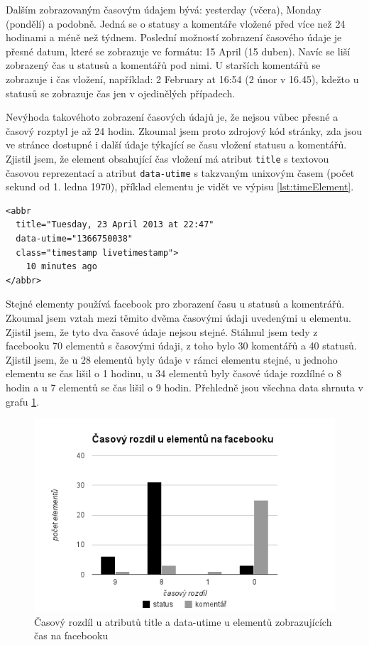 \documentclass[thesis=M,czech]{FITthesis}[2013/05/10]
\begin{document}
Dalším zobrazovaným časovým údajem bývá: yesterday (včera), Monday (pondělí) a podobně. Jedná se o statusy a komentáře vložené před více než 24 hodinami a méně než týdnem. Poslední možností zobrazení časového údaje je přesné datum, které se zobrazuje ve formátu: 15 April (15 duben). Navíc se liší zobrazený čas u statusů a komentářů pod nimi. U starších komentářů se zobrazuje i čas vložení, například: 2 February at 16:54 (2 únor v 16.45), kdežto u statusů se zobrazuje čas jen v ojedinělých případech.

Nevýhoda takovéhoto zobrazení časových údajů je, že nejsou vůbec přesné a časový rozptyl je až 24 hodin. Zkoumal jsem proto zdrojový kód stránky, zda jsou ve stránce dostupné i další údaje týkající se času vložení statusu a komentářů. Zjistil jsem, že element obsahující čas vložení má atribut \verb|title| s textovou časovou reprezentací a atribut \verb|data-utime| s takzvaným unixovým časem (počet sekund od 1. ledna 1970), příklad elementu je vidět ve výpisu \ref{lst:timeElement}. 

\begin{lstlisting}[caption={Příklad elementu obsahující čas},label=lst:timeElement,belowcaptionskip=0.4cm]
<abbr 
  title="Tuesday, 23 April 2013 at 22:47"
  data-utime="1366750038" 
  class="timestamp livetimestamp">
    10 minutes ago
</abbr>
\end{lstlisting}

Stejné elementy používá facebook pro zborazení času u statusů a komentrářů. Zkoumal jsem vztah mezi těmito dvěma časovými údaji uvedenými u elementu. Zjistil jsem, že tyto dva časové údaje nejsou stejné. Stáhnul jsem tedy z facebooku 70 elementů s časovými údaji, z toho bylo 30 komentářů a 40 statusů. Zjistil jsem, že u 28 elementů byly údaje v rámci elementu stejné, u jednoho elementu se čas lišil o 1 hodinu, u 34 elementů byly časové údaje rozdílné o 8 hodin a u 7 elementů se čas lišil o 9 hodin. Přehledně jsou všechna data shrnuta v grafu \ref{fig:timeDifference}.

\begin{figure}[h]
\begin{center}
\includegraphics[width=5in]{figures/time-difference.png}
\caption{Časový rozdíl u atributů title a data-utime u elementů zobrazujících čas na facebooku}
\label{fig:timeDifference}
\end{center}
\end{figure}
\end{document}
